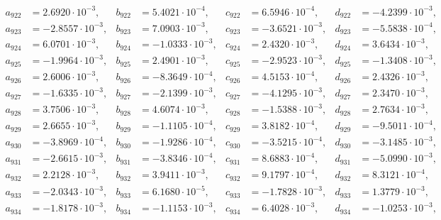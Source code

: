 \begin{align*}
  a_{ 922 } &= 2.6920 \cdot 10^{ -3 }, & b_{ 922 } &= 5.4021 \cdot 10^{ -4 }, & c_{ 922 } &= 6.5946 \cdot 10^{ -4 }, & d_{ 922 } &= -4.2399 \cdot 10^{ -3 }, \\ 
  a_{ 923 } &= -2.8557 \cdot 10^{ -3 }, & b_{ 923 } &= 7.0903 \cdot 10^{ -3 }, & c_{ 923 } &= -3.6521 \cdot 10^{ -3 }, & d_{ 923 } &= -5.5838 \cdot 10^{ -4 }, \\ 
  a_{ 924 } &= 6.0701 \cdot 10^{ -3 }, & b_{ 924 } &= -1.0333 \cdot 10^{ -3 }, & c_{ 924 } &= 2.4320 \cdot 10^{ -3 }, & d_{ 924 } &= 3.6434 \cdot 10^{ -3 }, \\ 
  a_{ 925 } &= -1.9964 \cdot 10^{ -3 }, & b_{ 925 } &= 2.4901 \cdot 10^{ -3 }, & c_{ 925 } &= -2.9523 \cdot 10^{ -3 }, & d_{ 925 } &= -1.3408 \cdot 10^{ -3 }, \\ 
  a_{ 926 } &= 2.6006 \cdot 10^{ -3 }, & b_{ 926 } &= -8.3649 \cdot 10^{ -4 }, & c_{ 926 } &= 4.5153 \cdot 10^{ -4 }, & d_{ 926 } &= 2.4326 \cdot 10^{ -3 }, \\ 
  a_{ 927 } &= -1.6335 \cdot 10^{ -3 }, & b_{ 927 } &= -2.1399 \cdot 10^{ -3 }, & c_{ 927 } &= -4.1295 \cdot 10^{ -3 }, & d_{ 927 } &= 2.3470 \cdot 10^{ -3 }, \\ 
  a_{ 928 } &= 3.7506 \cdot 10^{ -3 }, & b_{ 928 } &= 4.6074 \cdot 10^{ -3 }, & c_{ 928 } &= -1.5388 \cdot 10^{ -3 }, & d_{ 928 } &= 2.7634 \cdot 10^{ -3 }, \\ 
  a_{ 929 } &= 2.6655 \cdot 10^{ -3 }, & b_{ 929 } &= -1.1105 \cdot 10^{ -4 }, & c_{ 929 } &= 3.8182 \cdot 10^{ -4 }, & d_{ 929 } &= -9.5011 \cdot 10^{ -4 }, \\ 
  a_{ 930 } &= -3.8969 \cdot 10^{ -4 }, & b_{ 930 } &= -1.9286 \cdot 10^{ -4 }, & c_{ 930 } &= -3.5215 \cdot 10^{ -4 }, & d_{ 930 } &= -3.1485 \cdot 10^{ -3 }, \\ 
  a_{ 931 } &= -2.6615 \cdot 10^{ -3 }, & b_{ 931 } &= -3.8346 \cdot 10^{ -4 }, & c_{ 931 } &= 8.6883 \cdot 10^{ -4 }, & d_{ 931 } &= -5.0990 \cdot 10^{ -3 }, \\ 
  a_{ 932 } &= 2.2128 \cdot 10^{ -3 }, & b_{ 932 } &= 3.9411 \cdot 10^{ -3 }, & c_{ 932 } &= 9.1797 \cdot 10^{ -4 }, & d_{ 932 } &= 8.3121 \cdot 10^{ -4 }, \\ 
  a_{ 933 } &= -2.0343 \cdot 10^{ -3 }, & b_{ 933 } &= 6.1680 \cdot 10^{ -5 }, & c_{ 933 } &= -1.7828 \cdot 10^{ -3 }, & d_{ 933 } &= 1.3779 \cdot 10^{ -3 }, \\ 
  a_{ 934 } &= -1.8178 \cdot 10^{ -3 }, & b_{ 934 } &= -1.1153 \cdot 10^{ -3 }, & c_{ 934 } &= 6.4028 \cdot 10^{ -3 }, & d_{ 934 } &= -1.0253 \cdot 10^{ -3 }, \\ 

\end{align*}
